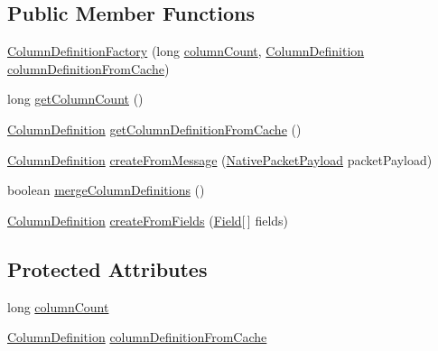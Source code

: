 \subsection*{Public Member Functions}
\begin{DoxyCompactItemize}
\item 
\mbox{\hyperlink{classcom_1_1mysql_1_1cj_1_1protocol_1_1a_1_1_column_definition_factory_ae00a6dce16530cd438008b0f38850337}{Column\+Definition\+Factory}} (long \mbox{\hyperlink{classcom_1_1mysql_1_1cj_1_1protocol_1_1a_1_1_column_definition_factory_ab70bfde683438b38a38429595659cd06}{column\+Count}}, \mbox{\hyperlink{interfacecom_1_1mysql_1_1cj_1_1protocol_1_1_column_definition}{Column\+Definition}} \mbox{\hyperlink{classcom_1_1mysql_1_1cj_1_1protocol_1_1a_1_1_column_definition_factory_ad0e12e85d3b3530e1e0775eae00255de}{column\+Definition\+From\+Cache}})
\item 
long \mbox{\hyperlink{classcom_1_1mysql_1_1cj_1_1protocol_1_1a_1_1_column_definition_factory_adde861830933cd973f1bde7bfe1d4163}{get\+Column\+Count}} ()
\item 
\mbox{\hyperlink{interfacecom_1_1mysql_1_1cj_1_1protocol_1_1_column_definition}{Column\+Definition}} \mbox{\hyperlink{classcom_1_1mysql_1_1cj_1_1protocol_1_1a_1_1_column_definition_factory_a6935c30af909c3267c63b0378de03a4a}{get\+Column\+Definition\+From\+Cache}} ()
\item 
\mbox{\hyperlink{interfacecom_1_1mysql_1_1cj_1_1protocol_1_1_column_definition}{Column\+Definition}} \mbox{\hyperlink{classcom_1_1mysql_1_1cj_1_1protocol_1_1a_1_1_column_definition_factory_a47bfe4acb103a43984c8f86966e9a011}{create\+From\+Message}} (\mbox{\hyperlink{classcom_1_1mysql_1_1cj_1_1protocol_1_1a_1_1_native_packet_payload}{Native\+Packet\+Payload}} packet\+Payload)
\item 
boolean \mbox{\hyperlink{classcom_1_1mysql_1_1cj_1_1protocol_1_1a_1_1_column_definition_factory_a463f6be609c68f3bdf101111712eeca7}{merge\+Column\+Definitions}} ()
\item 
\mbox{\hyperlink{interfacecom_1_1mysql_1_1cj_1_1protocol_1_1_column_definition}{Column\+Definition}} \mbox{\hyperlink{classcom_1_1mysql_1_1cj_1_1protocol_1_1a_1_1_column_definition_factory_ae8bd15c8a4739d2c98e613dc24aa2eea}{create\+From\+Fields}} (\mbox{\hyperlink{classcom_1_1mysql_1_1cj_1_1result_1_1_field}{Field}}\mbox{[}$\,$\mbox{]} fields)
\end{DoxyCompactItemize}
\subsection*{Protected Attributes}
\begin{DoxyCompactItemize}
\item 
long \mbox{\hyperlink{classcom_1_1mysql_1_1cj_1_1protocol_1_1a_1_1_column_definition_factory_ab70bfde683438b38a38429595659cd06}{column\+Count}}
\item 
\mbox{\hyperlink{interfacecom_1_1mysql_1_1cj_1_1protocol_1_1_column_definition}{Column\+Definition}} \mbox{\hyperlink{classcom_1_1mysql_1_1cj_1_1protocol_1_1a_1_1_column_definition_factory_ad0e12e85d3b3530e1e0775eae00255de}{column\+Definition\+From\+Cache}}
\end{DoxyCompactItemize}


